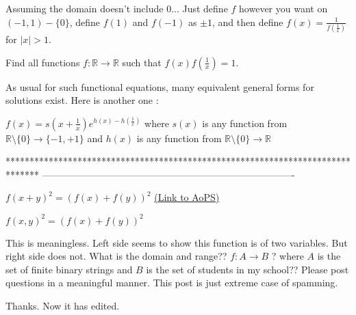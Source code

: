 \begin{solution}
	Assuming the domain doesn't include $0$... Just define $f$ however you want on $(-1, 1)-\{0\}$, define $f(1)$ and $f(-1)$ as $\pm 1$, and then define $f(x)=\frac{1}{f\left(\frac{1}{x}\right)}$ for $|x|>1$.
\end{solution}



\begin{solution}
	\begin{tcolorbox}Find all functions $f: \mathbb{R} \rightarrow \mathbb{R}$ such that $f(x)f \left( \frac{1}x \right) = 1$.\end{tcolorbox}
As usual for such functional equations, many equivalent general forms for solutions exist. Here is another one : 

$\boxed{f(x)=s(x+\frac 1x)e^{h(x)-h(\frac 1x)}}$ where $s(x)$ is any function from $\mathbb R\setminus\{0\}\to\{-1,+1\}$ and $h(x)$ is any function from $\mathbb R\setminus\{0\}\to\mathbb R$
\end{solution}
*******************************************************************************
-------------------------------------------------------------------------------

\begin{problem}
	$f{(x+y)^2} = {(f(x) + f(y))^2}$
	\flushright \href{https://artofproblemsolving.com/community/c6h589543}{(Link to AoPS)}
\end{problem}



\begin{solution}
	\begin{tcolorbox}$f{(x,y)^2} = {(f(x) + f(y))^2}$\end{tcolorbox}
This is meaningless. Left side seems to show this function is of two variables. But right side does not. What is the domain and range?? $f:A\to B$ ? where $A$ is the set of finite binary strings and $B$ is the set of students in my school?? Please post questions in a meaningful manner. This post is just extreme case of spamming.
\end{solution}



\begin{solution}
	Thanks. Now it has edited.
\end{solution}



